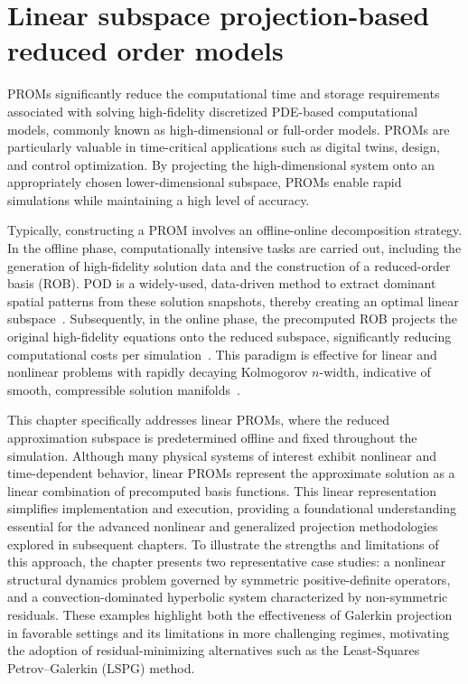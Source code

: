 \chapter{Linear subspace projection-based reduced order models}
\label{chap:linear_prom}

PROMs significantly reduce the computational time and storage requirements associated with solving high-fidelity discretized PDE-based computational models, commonly known as high-dimensional or full-order models. PROMs are particularly valuable in time-critical applications such as digital twins, design, and control optimization. By projecting the high-dimensional system onto an appropriately chosen lower-dimensional subspace, PROMs enable rapid simulations while maintaining a high level of accuracy.

Typically, constructing a PROM involves an offline-online decomposition strategy. In the offline phase, computationally intensive tasks are carried out, including the generation of high-fidelity solution data and the construction of a reduced-order basis (ROB). POD is a widely-used, data-driven method to extract dominant spatial patterns from these solution snapshots, thereby creating an optimal linear subspace~\cite{Sirovich1987, Balachandar1998}. Subsequently, in the online phase, the precomputed ROB projects the original high-fidelity equations onto the reduced subspace, significantly reducing computational costs per simulation~\cite{Antoulas2005, ngoc2005certified}. This paradigm is effective for linear and nonlinear problems with rapidly decaying Kolmogorov $n$-width, indicative of smooth, compressible solution manifolds~\cite{Rowley2004, benner2015survey}.

This chapter specifically addresses linear PROMs, where the reduced approximation subspace is predetermined offline and fixed throughout the simulation. Although many physical systems of interest exhibit nonlinear and time-dependent behavior, linear PROMs represent the approximate solution as a linear combination of precomputed basis functions. This linear representation simplifies implementation and execution, providing a foundational understanding essential for the advanced nonlinear and generalized projection methodologies explored in subsequent chapters. To illustrate the strengths and limitations of this approach, the chapter presents two representative case studies: a nonlinear structural dynamics problem governed by symmetric positive-definite operators, and a convection-dominated hyperbolic system characterized by non-symmetric residuals. These examples highlight both the effectiveness of Galerkin projection in favorable settings and its limitations in more challenging regimes, motivating the adoption of residual-minimizing alternatives such as the Least-Squares Petrov--Galerkin (LSPG) method.

